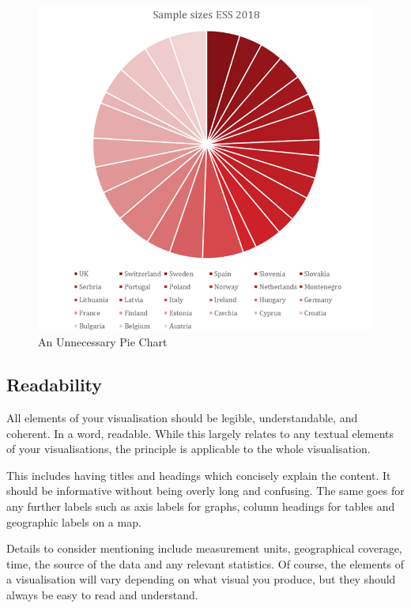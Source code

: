 \documentclass[
]{book}
\begin{document}
\begin{figure}
\centering
\includegraphics{img/Bad pie chart.png}
\caption{An Unnecessary Pie Chart}
\end{figure}

\hypertarget{readability}{%
\subsection{Readability}\label{readability}}

All elements of your visualisation should be legible, understandable, and coherent. In a word, readable. While this largely relates to any textual elements of your visualisations, the principle is applicable to the whole visualisation.

This includes having titles and headings which concisely explain the content. It should be informative without being overly long and confusing. The same goes for any further labels such as axis labels for graphs, column headings for tables and geographic labels on a map.

Details to consider mentioning include measurement units, geographical coverage, time, the source of the data and any relevant statistics.
Of course, the elements of a visualisation will vary depending on what visual you produce, but they should always be easy to read and understand.
\end{document}
